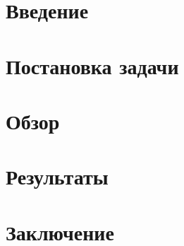 
\usepackage{newfloat,caption,float}
\usepackage{newfloat}
\usepackage{subcaption}

\captionsetup[example]{labelfont=bf}


\captionsetup[subexample]{labelformat=simple}

\newcommand{\ReasonML}{\textsc{ReasonML}}
\newcommand{\OCaml}{\textsc{OCaml}}
\newcommand{\ocamllex}{\textsc{ocamllex}}
\newcommand{\ocamlyacc}{\textsc{ocamlyacc}}
\newcommand{\merlin}{\textsc{merlin}}

\ifx\pdfoutput\undefined
\usepackage{graphicx}
\else
\usepackage[pdftex]{graphicx}
\fi
\usepackage{float}
\usepackage{caption}
\usepackage{subcaption}




\maketitle
\setcounter{tocdepth}{2}
\tableofcontents

\section{Введение}


\section{Постановка задачи}
\label{sec:task}


\section{Обзор}


\section{Результаты}


\section{Заключение}



\setmonofont[Mapping=tex-text]{CMU Typewriter Text}



